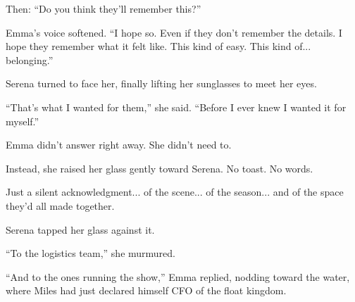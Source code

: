 Then: ``Do you think they’ll remember this?''

Emma’s voice softened. ``I hope so. Even if they don’t remember the details. I hope they remember what it 
felt like. This kind of easy. This kind of... belonging.''

Serena turned to face her, finally lifting her sunglasses to meet her eyes.

``That’s what I wanted for them,'' she said. ``Before I ever knew I wanted it for myself.''

Emma didn’t answer right away. She didn’t need to.

Instead, she raised her glass gently toward Serena.  
No toast. No words.

Just a silent acknowledgment... of the scene... of the season... and of the space they’d all made together.

Serena tapped her glass against it.

``To the logistics team,'' she murmured.

``And to the ones running the show,'' Emma replied, nodding toward the water, where Miles had just declared 
himself CFO of the float kingdom.

\medskip

